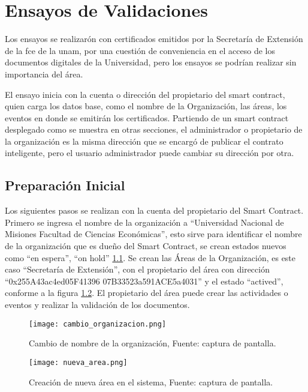 \chapter{Ensayos de Validaciones} \label{c:ensayo_validacion}
Los ensayos se realizarón con certificados emitidos por la  Secretaría de Extensión de la \gls{fce} de la \gls{unam}, por una cuestión
de conveniencia en el acceso de los documentos digitales de la Universidad, pero los ensayos se podrían realizar sin importancia del área.


El ensayo inicia con la cuenta o dirección del propietario del smart contract, quien  carga los datos base, como el nombre de la Organización, las áreas, los eventos en donde se emitirán los certificados.
Partiendo de un smart contract desplegado como se muestra en otras secciones, el administrador o propietario de la organización es la misma   dirección que se encargó  
de publicar el contrato inteligente, pero el usuario administrador puede cambiar su dirección por otra.
\section{Preparación Inicial}
Los siguientes pasos se realizan con la cuenta del propietario del Smart Contract.
Primero se ingresa el nombre de la organización a “Universidad Nacional de Misiones Facultad de Ciencias Económicas”, esto sirve para identificar el nombre de la organización 
que es dueño del Smart Contract, se 
crean estados nuevos como “en espera”, “on hold” \ref{img:cambio_org}.
Se crean las Áreas de la Organización, es este caso “Secretaría de Extensión”, con el propietario del área con dirección  “0x255A43ac4ed05F41396 07B33523a591ACE5a4031”
y el estado “actived”, conforme a la figura \ref{img:nuva_area}. El propietario del área puede crear las actividades o eventos y realizar la validación de los 
documentos.

\begin{figure}[H]
  \centering
  {\texttt{[image: cambio\_organizacion.png]}}
  \caption{Cambio de nombre de la organización,  Fuente: captura de pantalla. }
  \label{img:cambio_org}
\end{figure}

\begin{figure}[H]
  \centering
  {\texttt{[image: nueva\_area.png]}}
  \caption{Creación de nueva área en el sistema,  Fuente: captura de pantalla. }
  \label{img:nuva_area}
\end{figure}



